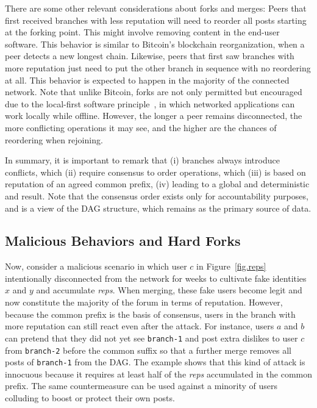 \documentclass[12pt]{article}
\newcommand{\reps}     {\emph{reps}\xspace}
\newcommand{\code}[1]  {\texttt{\footnotesize{#1}}}
\begin{document}
There are some other relevant considerations about forks and merges:
%
Peers that first received branches with less reputation will need to reorder
all posts starting at the forking point.
This might involve removing content in the end-user software.
This behavior is similar to Bitcoin's blockchain reorganization, when a peer
detects a new longest chain. %
%
Likewise, peers that first saw branches with more reputation just need to put
the other branch in sequence with no reordering at all.
This behavior is expected to happen in the majority of the connected network.
%
Note that unlike Bitcoin, forks are not only permitted but encouraged due to
the local-first software principle~\cite{p2p.local}, in which networked
applications can work locally while offline.
However, the longer a peer remains disconnected, the more conflicting
operations it may see, and the higher are the chances of reordering when
rejoining.

In summary, it is important to remark that
    (i) branches always introduce conflicts, which
    (ii) require consensus to order operations, which
    (iii) is based on reputation of an agreed common prefix,
    (iv) leading to a global and deterministic and result.
%
Note that the consensus order exists only for accountability purposes, and is
a view of the DAG structure, which remains as the primary source of data.

\subsection{Malicious Behaviors and Hard Forks}

Now, consider a malicious scenario in which user $c$ in Figure~\ref{fig.reps}
intentionally disconnected from the network for weeks to cultivate fake
identities $x$ and $y$ and accumulate \reps.
When merging, these fake users become legit and now constitute the majority of
the forum in terms of reputation.
%
However, because the common prefix is the basis of consensus, users in the
branch with more reputation can still react even after the attack.
For instance, users $a$ and $b$ can pretend that they did not yet see
\code{branch-1} and post extra dislikes to user $c$ from \code{branch-2} before
the common suffix so that a further merge removes all posts of \code{branch-1}
from the DAG.
%
The example shows that this kind of attack is innocuous because it requires at
least half of the \reps accumulated in the common prefix.
%
The same countermeasure can be used against a minority of users colluding to
boost or protect their own posts.
\end{document}
